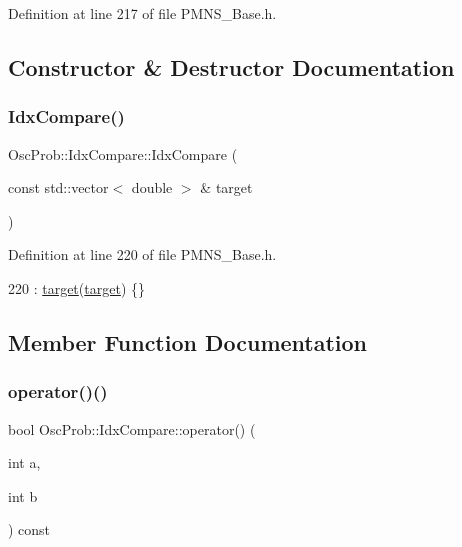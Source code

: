 Definition at line 217 of file P\+M\+N\+S\+\_\+\+Base.\+h.



\subsection{Constructor \& Destructor Documentation}
\mbox{\label{structOscProb_1_1IdxCompare_af1c43639da52d0c66e587c7432582cb5}} 
\subsubsection{\texorpdfstring{Idx\+Compare()}{IdxCompare()}}
{\footnotesize\ttfamily Osc\+Prob\+::\+Idx\+Compare\+::\+Idx\+Compare (\begin{DoxyParamCaption}\item[{const std\+::vector$<$ double $>$ \&}]{target }\end{DoxyParamCaption})\hspace{0.3cm}{\ttfamily [inline]}}



Definition at line 220 of file P\+M\+N\+S\+\_\+\+Base.\+h.


\begin{DoxyCode}
220 : \hyperlink{structOscProb_1_1IdxCompare_ab3258085f0afeb64bf472413bfed43ac}{target}(\hyperlink{structOscProb_1_1IdxCompare_ab3258085f0afeb64bf472413bfed43ac}{target}) \{\}
\end{DoxyCode}


\subsection{Member Function Documentation}
\mbox{\label{structOscProb_1_1IdxCompare_ac4c6fc547109b3e0007d6342eea57dff}} 
\subsubsection{\texorpdfstring{operator()()}{operator()()}}
{\footnotesize\ttfamily bool Osc\+Prob\+::\+Idx\+Compare\+::operator() (\begin{DoxyParamCaption}\item[{int}]{a,  }\item[{int}]{b }\end{DoxyParamCaption}) const\hspace{0.3cm}{\ttfamily [inline]}}




